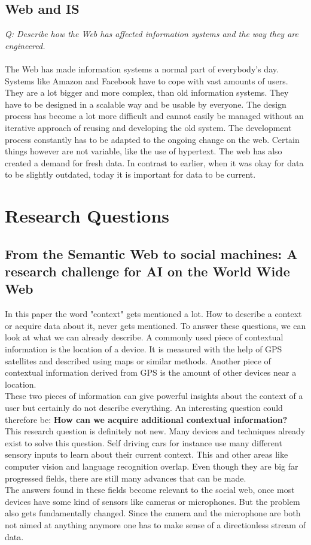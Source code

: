 \documentclass{sig-alternate-05-2015}
\begin{document}
\subsection{Web and IS}
{\it Q: Describe how the Web has affected information systems and the way they are engineered.}\\\\
The Web has made information systems a normal part of everybody's day. Systems like Amazon and Facebook have to cope with vast amounts of users. They are a lot bigger and more complex, than old information systems. They have to be designed in a scalable way and be usable by everyone. The design process has become a lot more difficult and cannot easily be managed without an iterative approach of reusing and developing the old system. The development process constantly has to be adapted to the ongoing change on the web. Certain things however are not variable, like the use of hypertext. The web has also created a demand for fresh data. In contrast to earlier, when it was okay for data to be slightly outdated, today it is important for data to be current.

\section{Research Questions}
\subsection{From the Semantic Web to social machines: A research challenge for AI
on the World Wide Web \cite{paper1}}
In this paper the word "context" gets mentioned a lot. How to describe a context or acquire data about it, never gets mentioned. To answer these questions, we can look at what we can already describe. A commonly used piece of contextual information is the location of a device. It is measured with the help of GPS satellites and described using maps or similar methods. Another piece of contextual information derived from GPS is the amount of other devices near a location.\\
These two pieces of information can give powerful insights about the context of a user but certainly do not describe everything. An interesting question could therefore be: {\bf How can we acquire additional contextual information?}\\
This research question is definitely not new. Many devices and techniques already exist to solve this question. Self driving cars for instance use many different sensory inputs to learn about their current context. This and other areas like computer vision and language recognition overlap. Even though they are big far progressed fields, there are still many advances that can be made.\\
The answers found in these fields become relevant to the social web, once most devices have some kind of sensors like cameras or microphones. But the problem also gets fundamentally changed. Since the camera and the microphone are both not aimed at anything anymore one has to make sense of a directionless stream of data.
\end{document}
